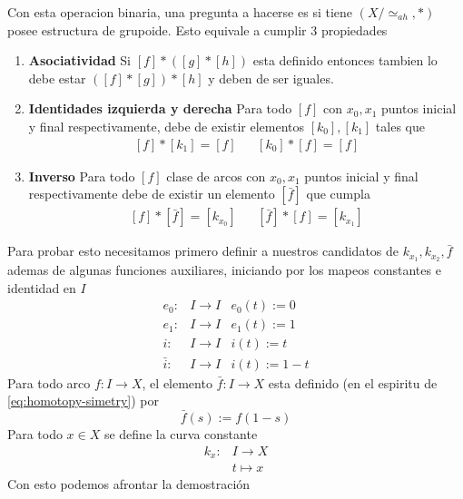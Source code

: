 \documentclass[letterpaper]{article}
\theoremstyle{definition}
\theoremstyle{plain}
\theoremstyle{plain}
\theoremstyle{remark}
\begin{document}
Con esta operacion binaria, una pregunta a hacerse es si tiene
\((X/\simeq_{ah} , *)\) posee
estructura de grupoide. Esto equivale a cumplir 3 propiedades
\begin{enumerate}
\item \textbf{Asociatividad} Si \([f] * ([g] * [h])\) esta definido entonces
  tambien lo debe estar \(([f] * [g]) * [h]\) y deben de ser iguales.
\item \textbf{Identidades izquierda y derecha} Para todo \([f]\) con
  \(x_0, x_1\) puntos inicial y final respectivamente, debe de
existir elementos \([k_{0}], [k_{1}]\) tales que
\[ \begin{matrix}
    [f] * [k_{1}] = [f] & & [k_{0}] * [f] = [f]
  \end{matrix}
\]
\item \textbf{Inverso} Para todo \([f]\) clase de arcos con \(x_0, x_1\)
  puntos inicial y final respectivamente debe de existir un elemento
  \([\bar{f}]\) que cumpla
\[ \begin{matrix}
    [f] * [\bar{f}] = [k_{x_0}] & & [\bar{f}] * [f] = [k_{x_1}]
  \end{matrix}
\]
\end{enumerate}
Para probar esto necesitamos primero definir a nuestros candidatos de
\(k_{x_1}, k_{x_2}, \bar{f}\) ademas de algunas funciones auxiliares,
iniciando por los mapeos constantes e identidad en \(I\)
\[ \begin{matrix}
     e_0 : & I \to I & e_0(t) := 0 \\
     e_1 : & I \to I & e_1(t) := 1 \\
     i :   & I \to I & i(t) := t \\
     \bar{i} : & I \to I & i(t) := 1 - t
   \end{matrix}
   \]
Para todo arco \(f : I \to X \), el elemento \(\bar{f} : I \to X \) esta
definido (en el espiritu de \eqref{eq:homotopy-simetry}) por
\[ \bar{f} (s) := f (1 - s) \]
Para todo \(x \in X \) se define la curva constante
\begin{align*}
  k_x : &I \to X \\
        &t \mapsto x
\end{align*}
Con esto podemos afrontar la demostración
\end{document}
